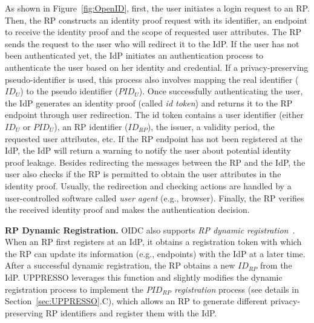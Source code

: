 As shown in Figure~\ref{fig:OpenID}, first, the user initiates a login request to an RP. Then, the RP constructs an identity proof request with its identifier, an endpoint to receive the identity proof and the scope of requested user attributes. The RP sends the request to the user who will redirect it to the IdP. If the user has not been authenticated yet, the IdP initiates an authentication process to authenticate the user based on her identity and credential. If a privacy-preserving pseudo-identifier is used, this process also involves mapping the real identifier ($ID_U$) to the pseudo identifier ($PID_U$). %
Once successfully authenticating the user, the IdP generates an identity proof (called {\em id token}) and returns it to the RP endpoint through user redirection. The id token contains a user identifier (either $ID_U$ or $PID_U$), an RP identifier ($ID_{RP}$), the issuer, a validity period, the requested user attributes, etc. If the RP endpoint has not been registered at the IdP, the IdP will return a warning to notify the user about potential identity proof leakage. Besides redirecting the messages between the RP and the IdP, the user also checks if the RP is permitted to obtain the user attributes in the identity proof. Usually, the redirection and checking actions are handled by a user-controlled software called {\em user agent} (e.g., browser). Finally, the RP verifies the received identity proof and makes the authentication decision.

\noindent\textbf{RP Dynamic Registration.}
OIDC also supports {\em RP dynamic registration}~\cite{DynamicRegistration}. When an RP first registers at an IdP, it obtains a registration token with which the RP can %
update its information (e.g., endpoints) with the IdP at a later time. After a successful dynamic registration, the RP obtains a new $ID_{RP}$ from the IdP.
UPPRESSO leverages this function and slightly modifies the dynamic registration process to implement the {\em $PID_{RP}$ registration} process (see details in Section~\ref{sec:UPPRESSO}.C), which allows an RP to generate different privacy-preserving RP identifiers and register them with the IdP.

